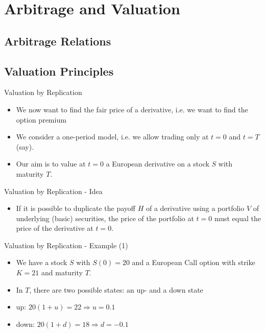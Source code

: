 \section{Arbitrage and Valuation}

\begin{frame}
    \frametitle{}
\vspace{0cm}
\begin{center}
\end{center}
\end{frame}

\subsection{Arbitrage Relations}
\subsection{Valuation Principles}



{Valuation by Replication}
\begin{itemize}
\item We now want to find the fair price of a derivative, i.e. we want to find the option premium
\vspace{0.3cm}
  \item We consider a one-period model, i.e. we allow trading only at
$t=0$ and $t=T$(say).
  \item Our aim is to value at $t=0$  a European
derivative on a stock $S$ with maturity $T$.
\end{itemize}



{Valuation by Replication - Idea}
\begin{itemize}
  \item If it is possible to duplicate the payoff $H$ of a derivative
using a portfolio $V$ of underlying (basic) securities, the price of the
portfolio at $t=0$ must equal the price of the derivative at
$t=0$.
\end{itemize}



{Valuation by Replication - Example (1)}
\begin{itemize}
  \item We have a stock $S$ with $S(0)=20$ and a European Call option with strike $K=21$ and maturity $T$.
  \item In $T$, there are two possible states: an up- and a down state
\end{itemize}
\begin{itemize}
  \item up: $20 (1+u)=22 \Rightarrow u=0.1$
  \item down: $20 (1+d)=18 \Rightarrow d=-0.1$
\end{itemize}



